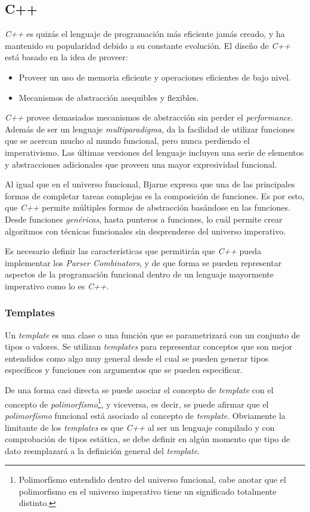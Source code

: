 	\subsection{C++}
	\emph{C++} es quizás el lenguaje de programación más eficiente jamás creado, y ha mantenido su popularidad debido a su constante evolución. El diseño de \emph{C++} está basado en la idea de proveer:	
	\begin{itemize}
		\item Proveer un uso de memoria eficiente y operaciones eficientes de bajo nivel.
		\item Mecanismos de abstracción asequibles y flexibles. \cite{Bjarne2013}
	\end{itemize}
	
	\emph{C++} provee demasiados mecanismos de abstracción sin perder el \emph{performance}. Además de ser un lenguaje \emph{multiparadigma}, da la facilidad de utilizar funciones que se acercan mucho al mundo funcional, pero nunca perdiendo el imperativismo. Las últimas versiones del lenguaje incluyen una serie de elementos y abstracciones adicionales que proveen una mayor expresividad funcional.
	
	Al igual que en el universo funcional, Bjarne expresa que una de las principales formas de completar tareas complejas es la composición de funciones. Es por esto, que \emph{C++} permite múltiples formas de abstracción basándose en las funciones. Desde funciones \emph{genéricas}, hasta punteros a funciones, lo cuál permite crear algoritmos con técnicas funcionales sin desprenderse del universo imperativo. 
	
	Es necesario definir las características que permitirán que \emph{C++} pueda implementar los \emph{Parser Combinators}, y de que forma se pueden representar aspectos de la programación funcional dentro de un lenguaje mayormente imperativo como lo es \emph{C++}.
	
	\subsubsection{Templates}
		Un \emph{template} es una clase o una función que se parametrizará con un conjunto de tipos o valores. Se utilizan \emph{templates} para representar conceptos que son mejor entendidos como algo muy general desde el cual se pueden generar tipos específicos y funciones con argumentos que se pueden especificar. \cite{Bjarne2013}
		
		De una forma casi directa se puede asociar el concepto de \emph{template} con el concepto de \emph{polimorfísmo}\footnote{Polimorfísmo entendido dentro del universo funcional, cabe anotar que el polimorfismo en el universo imperativo tiene un significado totalmente distinto.}, y viceversa, es decir, se puede afirmar que el \emph{polimorfísmo} funcional está asociado al concepto de \emph{template}. Obviamente la limitante de los \emph{templates} es que \emph{C++} al ser un lenguaje compilado y con comprobación de tipos estática, se debe definir en algún momento que tipo de dato reemplazará a la definición general del \emph{template}.
		
